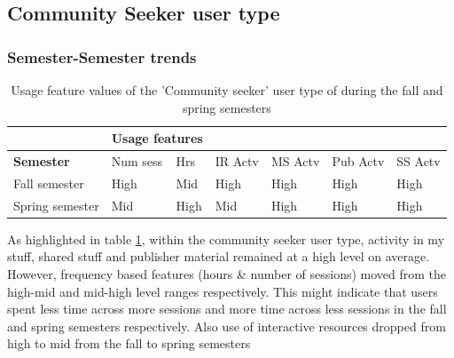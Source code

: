 \documentclass{acm_proc_article-sp}
\begin{document}
\subsection{Community Seeker user type}

\subsubsection{Semester-Semester trends}

\begin{table}
\caption{Usage feature values of the 'Community seeker' user type of during the fall and  spring semesters}
\label{cluster2semester}
\begin{tabular}{|p{1.5cm}|p{0.6cm}|p{0.6cm}|p{0.6cm}|p{0.6cm}|p{0.8cm}|p{0.8cm}|}
& \multicolumn{2}{r}{\textbf{Usage features}}  \\ \hline
 \textbf{Semester} 
 & Num sess & Hrs & IR Actv & MS Actv & Pub Actv & SS Actv \\ \hline
Fall  semester & High & Mid  & High & High & High & High \\ \hline
Spring semester & Mid & High  & Mid & High & High & High \\ \hline
\end{tabular}
\end{table}

As highlighted in table \ref{cluster2semester}, within the community seeker user type, activity in my stuff, shared stuff and publisher material remained at a high level on average. However, frequency based features (hours \& number of sessions) moved from the high-mid and mid-high level ranges respectively. This might indicate that users  spent less time across more sessions and more time across less sessions in the fall and spring semesters respectively. Also use of interactive resources dropped from high to mid from the fall to spring semesters
\end{document}
